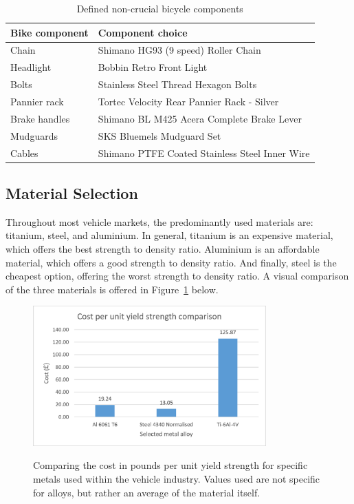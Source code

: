 \documentclass[a4paper,11pt]{article}
\begin{document}
\begin{table}[!ht]
	\centering
	\caption{Defined non-crucial bicycle components}
	\begin{tabular}{l l}
		\hline
		Bike component&Component choice\\ \hline
		Chain 	&Shimano HG93 (9 speed) Roller Chain \\
		Headlight	&Bobbin Retro Front Light \\
		Bolts	&Stainless Steel Thread Hexagon Bolts\\
		Pannier rack	&Tortec Velocity Rear Pannier Rack - Silver\\
		Brake handles	&Shimano BL M425 Acera Complete Brake Lever\\
		Mudguards	&SKS Bluemels Mudguard Set \\
		Cables	&Shimano PTFE Coated Stainless Steel Inner Wire 
	\end{tabular}
\end{table}


\subsection{Material Selection}
\label{sec:matse}

Throughout most vehicle markets, the predominantly used materials are: titanium, steel, and aluminium. In general, titanium is an expensive material, which offers the best strength to density ratio. Aluminium is an affordable material, which offers a good strength to density ratio. And finally, steel is the cheapest option, offering the worst strength to density ratio. A visual comparison of the three materials is offered in Figure~\ref{fig:cpuc} below. 

\begin{figure}[ht]
	\centering
	\includegraphics[width=0.8\textwidth]{cpuc}
	\caption{Comparing the cost in pounds per unit yield strength for specific metals used within the vehicle industry. Values used are not specific for alloys, but rather an average of the material itself.}
	\cite{CES}
	\label{fig:cpuc}
\end{figure}
\end{document}
